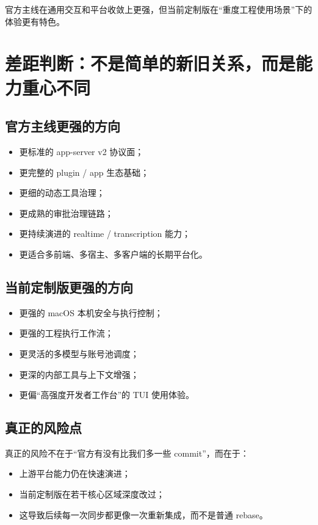\documentclass[UTF8,11pt]{ctexart}
\begin{document}
官方主线在通用交互和平台收敛上更强，但当前定制版在“重度工程使用场景”下的体验更有特色。

\section{差距判断：不是简单的新旧关系，而是能力重心不同}

\subsection{官方主线更强的方向}
\begin{itemize}[nosep]
  \item 更标准的 app-server v2 协议面；
  \item 更完整的 plugin / app 生态基础；
  \item 更细的动态工具治理；
  \item 更成熟的审批治理链路；
  \item 更持续演进的 realtime / transcription 能力；
  \item 更适合多前端、多宿主、多客户端的长期平台化。
\end{itemize}

\subsection{当前定制版更强的方向}
\begin{itemize}[nosep]
  \item 更强的 macOS 本机安全与执行控制；
  \item 更强的工程执行工作流；
  \item 更灵活的多模型与账号池调度；
  \item 更深的内部工具与上下文增强；
  \item 更偏“高强度开发者工作台”的 TUI 使用体验。
\end{itemize}

\subsection{真正的风险点}
真正的风险不在于“官方有没有比我们多一些 commit”，而在于：
\begin{itemize}[nosep]
  \item 上游平台能力仍在快速演进；
  \item 当前定制版在若干核心区域深度改过；
  \item 这导致后续每一次同步都更像一次重新集成，而不是普通 rebase。
\end{itemize}
\end{document}
